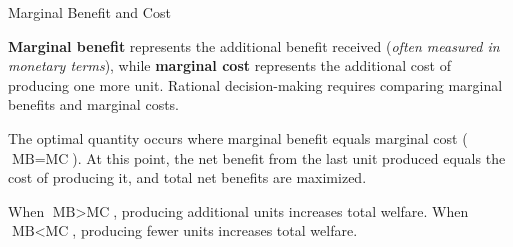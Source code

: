 \documentclass[10pt]{article}
\begin{document}
  \begin{core}[label=core:mb_mc]{Marginal Benefit and Cost}

    \textbf{Marginal benefit} represents the additional benefit received (\textit{often measured in monetary terms}), while \textbf{marginal cost} represents the additional cost of producing one more unit. Rational decision-making requires comparing marginal benefits and marginal costs.


    The optimal quantity occurs where marginal benefit equals marginal cost ($\text{MB} = \text{MC}$). At this point, the net benefit from the last unit produced equals the cost of producing it, and total net benefits are maximized.

    When $\text{MB} > \text{MC}$, producing additional units increases total welfare. When $\text{MB} < \text{MC}$, producing fewer units increases total welfare.

  \end{core}
\end{document}
